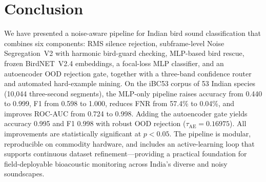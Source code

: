 \documentclass[conference]{IEEEtran}
\begin{document}
\section{Conclusion}

We have presented a noise-aware pipeline for Indian bird sound classification that combines six components: RMS silence rejection, subframe-level Noise Segregation~V2 with harmonic bird-guard checking, MLP-based bird rescue, frozen BirdNET~V2.4 embeddings, a focal-loss MLP classifier, and an autoencoder OOD rejection gate, together with a three-band confidence router and automated hard-example mining. On the iBC53 corpus of 53 Indian species (10,044 three-second segments), the MLP-only pipeline raises accuracy from 0.440 to 0.999, F1 from 0.598 to 1.000, reduces FNR from 57.4\% to 0.04\%, and improves ROC-AUC from 0.724 to 0.998. Adding the autoencoder gate yields accuracy 0.995 and F1 0.998 with robust OOD rejection ($\tau_\text{AE}=0.16975$). All improvements are statistically significant at $p < 0.05$. The pipeline is modular, reproducible on commodity hardware, and includes an active-learning loop that supports continuous dataset refinement---providing a practical foundation for field-deployable bioacoustic monitoring across India's diverse and noisy soundscapes.
\end{document}
